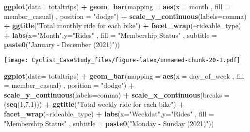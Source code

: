 \documentclass[
]{article}
\newenvironment{Shaded}{\begin{snugshade}}{\end{snugshade}}
\newcommand{\AttributeTok}[1]{\textcolor[rgb]{0.13,0.29,0.53}{#1}}
\newcommand{\DecValTok}[1]{\textcolor[rgb]{0.00,0.00,0.81}{#1}}
\newcommand{\FunctionTok}[1]{\textcolor[rgb]{0.13,0.29,0.53}{\textbf{#1}}}
\newcommand{\NormalTok}[1]{#1}
\newcommand{\SpecialCharTok}[1]{\textcolor[rgb]{0.81,0.36,0.00}{\textbf{#1}}}
\newcommand{\StringTok}[1]{\textcolor[rgb]{0.31,0.60,0.02}{#1}}
\begin{document}
\begin{Shaded}
\begin{Highlighting}[]
\FunctionTok{ggplot}\NormalTok{(}\AttributeTok{data=}\NormalTok{ totaltrips) }\SpecialCharTok{+} \FunctionTok{geom\_bar}\NormalTok{(}\AttributeTok{mapping =} \FunctionTok{aes}\NormalTok{(}\AttributeTok{x =}\NormalTok{ month , }\AttributeTok{fill =}\NormalTok{ member\_casual) , }\AttributeTok{position =} \StringTok{"dodge"}\NormalTok{) }\SpecialCharTok{+} \FunctionTok{scale\_y\_continuous}\NormalTok{(}\AttributeTok{labels=}\NormalTok{comma) }\SpecialCharTok{+} \FunctionTok{ggtitle}\NormalTok{(}\StringTok{"Total monthly ride for each bike"}\NormalTok{) }\SpecialCharTok{+} \FunctionTok{facet\_wrap}\NormalTok{(}\SpecialCharTok{\textasciitilde{}}\NormalTok{rideable\_type) }\SpecialCharTok{+} \FunctionTok{labs}\NormalTok{(}\AttributeTok{x=}\StringTok{"Month"}\NormalTok{,}\AttributeTok{y=}\StringTok{"Rides"}\NormalTok{ , }\AttributeTok{fill =} \StringTok{"Membership Status"}\NormalTok{ , }\AttributeTok{subtitle =} \FunctionTok{paste0}\NormalTok{(}\StringTok{"January {-} December (2021)"}\NormalTok{))}
\end{Highlighting}
\end{Shaded}

\texttt{[image: Cyclist\_CaseStudy\_files/figure-latex/unnamed-chunk-20-1.pdf]}

\begin{Shaded}
\begin{Highlighting}[]
\FunctionTok{ggplot}\NormalTok{(}\AttributeTok{data=}\NormalTok{ totaltrips) }\SpecialCharTok{+} \FunctionTok{geom\_bar}\NormalTok{(}\AttributeTok{mapping =} \FunctionTok{aes}\NormalTok{(}\AttributeTok{x =}\NormalTok{ day\_of\_week , }\AttributeTok{fill =}\NormalTok{ member\_casual) , }\AttributeTok{position =} \StringTok{"dodge"}\NormalTok{) }\SpecialCharTok{+} \FunctionTok{scale\_y\_continuous}\NormalTok{(}\AttributeTok{labels=}\NormalTok{comma) }\SpecialCharTok{+} \FunctionTok{scale\_x\_continuous}\NormalTok{(}\AttributeTok{breaks =}\NormalTok{ (}\FunctionTok{seq}\NormalTok{(}\DecValTok{1}\NormalTok{,}\DecValTok{7}\NormalTok{,}\DecValTok{1}\NormalTok{))) }\SpecialCharTok{+} \FunctionTok{ggtitle}\NormalTok{(}\StringTok{"Total weekly ride for each bike"}\NormalTok{) }\SpecialCharTok{+} \FunctionTok{facet\_wrap}\NormalTok{(}\SpecialCharTok{\textasciitilde{}}\NormalTok{rideable\_type) }\SpecialCharTok{+} \FunctionTok{labs}\NormalTok{(}\AttributeTok{x=}\StringTok{"Weekdat"}\NormalTok{,}\AttributeTok{y=}\StringTok{"Rides"}\NormalTok{ , }\AttributeTok{fill =} \StringTok{"Membership Status"}\NormalTok{ , }\AttributeTok{subtitle =} \FunctionTok{paste0}\NormalTok{(}\StringTok{"Monday {-} Sunday (2021)"}\NormalTok{))}
\end{Highlighting}
\end{Shaded}
\end{document}
